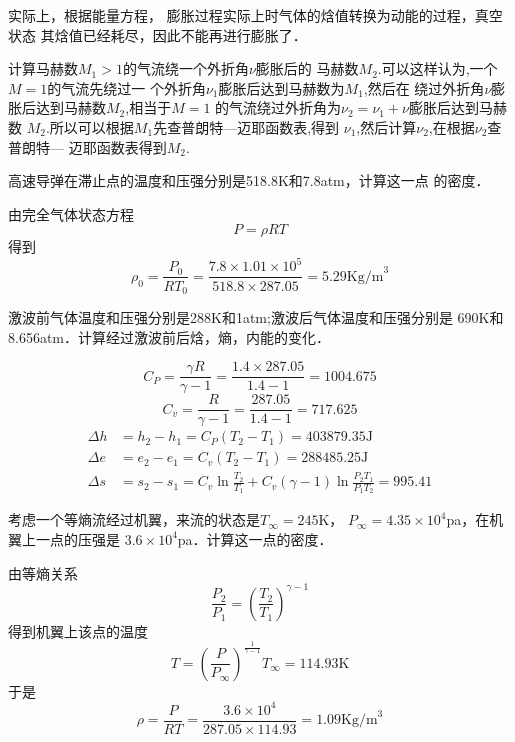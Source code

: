 实际上，根据能量方程， 膨胀过程实际上时气体的焓值转换为动能的过程，真空状态
其焓值已经耗尽，因此不能再进行膨胀了．
\begin{notice}
    计算马赫数$M_1>1$的气流绕一个外折角$\nu$膨胀后的
    马赫数$M_2$.可以这样认为,一个$M=1$的气流先绕过一
    个外折角$\nu_1$膨胀后达到马赫数为$M_1$,然后在
    绕过外折角$\nu$膨胀后达到马赫数$M_2$,相当于$M=1$
    的气流绕过外折角为$\nu_2=\nu_1+\nu$膨胀后达到马赫数
    $M_2$.所以可以根据$M_1$先查普朗特---迈耶函数表,得到
    $\nu_1$,然后计算$\nu_2$,在根据$\nu_2$查普朗特---
    迈耶函数表得到$M_2$.
\end{notice}
\begin{example}
	高速导弹在滞止点的温度和压强分别是518.8K和7.8atm，计算这一点
	的密度．

	由完全气体状态方程
	\[
		P=\rho R T
	\]
	得到
	\[
		\rho_0 =\frac{P_0}{R T_0 }=\frac{7.8\times 1.01\times 10^5 }
		{518.8\times 287.05}=5.29 \text{Kg/m}^3
	\]
\end{example}

\begin{example}
	激波前气体温度和压强分别是288K和1atm;激波后气体温度和压强分别是
	690K和8.656atm．计算经过激波前后焓，熵，内能的变化．

	\[
		C_P=\frac{\gamma R}{\gamma-1}=\frac{1.4\times 287.05}{1.4-1}=1004.675
	\]
	\[
		C_v=\frac{R}{\gamma-1}=\frac{287.05}{1.4-1}=717.625
	\]
	\begin{equation*}
		\begin{split}
			\Delta h & =h_2-h_1=C_P(T_2-T_1)=403879.35\text{J}        \\
			\Delta e & =e_2-e_1=C_v(T_2-T_1)=288485.25\text{J}        \\
			\Delta s & =s_2-s_1=C_v \ln \frac{T_2}{T_1}+C_v(\gamma-1)
			\ln \frac{P_2T_1}{P_1T_2}=995.41
		\end{split}
	\end{equation*}
\end{example}

\begin{example}
	考虑一个等熵流经过机翼，来流的状态是$T_\infty=245$K，
	$P_\infty=4.35\times 10^4 $pa，在机翼上一点的压强是
	$3.6\times 10^4 $pa．计算这一点的密度．

	由等熵关系
	\[
		\frac{P_2}{P_1}=\left(\frac{T_2}{T_1}\right)^{\gamma-1}
	\]
	得到机翼上该点的温度
	\[
		T=(\frac{P}{P_\infty})^{\frac{1}{\gamma-1}}T_\infty=114.93\text{K}
	\]
	于是
	\[
		\rho =\frac{P}{RT}=\frac{3.6\times 10^4}{287.05\times 114.93}=1.09
		\text{Kg/m}^3
	\]
\end{example}

